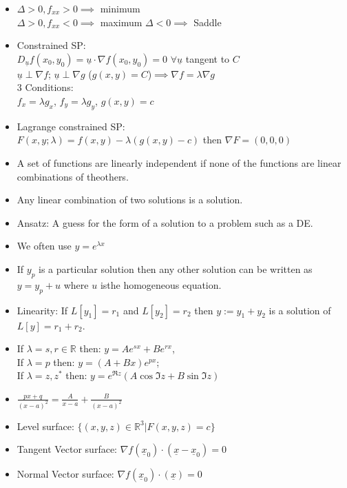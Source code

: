 \documentclass[10pt]{article}
\begin{document}
\begin{multicols}{2}
\begin{itemize}
    \item $\Delta>0,f_{xx}>0\implies$ minimum\\ $\Delta>0, f_{xx}<0\implies$ maximum $\Delta<0\implies$ Saddle
    \item Constrained SP:\\ $D_{\underline{u}}f(x_{0},y_{0})=\underline{u}\cdot\nabla f(x_{0},y_{0})=0$ $\forall\underline{u}$ tangent to $C$\\
    $\underline{u}\perp\nabla f$; $\underline{u}\perp\nabla g$ ($g(x,y)=C$)$\implies\nabla f=\lambda\nabla g$\\
    3 Conditions:\\
    $f_{x}=\lambda g_{x}$, $f_{y}=\lambda g_{y}$, $g(x,y)=c$
    \item Lagrange constrained SP:\\
    $F(x,y;\lambda)=f(x,y)-\lambda(g(x,y)-c)$ then $\nabla F=(0,0,0)$
    \item A set of functions are linearly independent if none of the functions are linear combinations of theothers.
    \item Any linear combination of two solutions is a solution. 
    \item Ansatz: A guess for the form of a solution to a problem such as a DE.
    \item We often use $y=e^{\lambda x}$
    \item If $y_{p}$ is a particular solution then any other solution can be written as $y=y_{p}+u$ where $u$ isthe homogeneous equation. 
    \item Linearity: If $L[y_{1}]=r_{1}$ and $L[y_{2}]=r_{2}$ then $y:=y_{1}+y_{2}$ is a solution of$L[y]=r_{1}+r_{2}$.
    \item If $\lambda=s,r\in\mathbb{R}$ then: $y=Ae^{sx}+Be^{rx}$,\\
    If $\lambda=p$ then: $y=(A+Bx)e^{px}$;\\
    If $\lambda=z,z^{*}$ then: $y=e^{\Re{z}}(A\cos{\Im{z}}+B\sin{\Im{z}})$
    \item$\frac{px+q}{(x-a)^{2}}=\frac{A}{x-a}+\frac{B}{(x-a)^{2}}$
    \item Level surface: $\{(x,y,z)\in\mathbb{R}^{3}|F(x,y,z)=c\}$
    \item Tangent Vector surface: $\nabla f(\underline{x}_{0})\cdot(\underline{x}-\underline{x}_{0})=0$
    \item Normal Vector surface: $\nabla f(\underline{x}_{0})\cdot(\underline{x})=0$
    \end{itemize}
\end{multicols}
\end{document}
